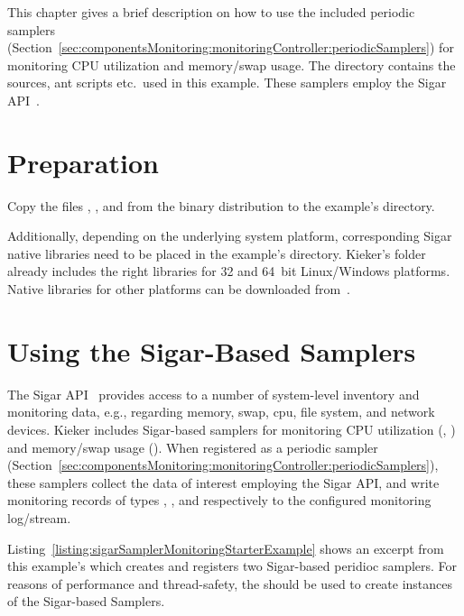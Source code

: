 This chapter gives a brief description on how to use the included %
periodic samplers (Section~\ref{sec:componentsMonitoring:monitoringController:periodicSamplers}) %
for monitoring CPU utilization and memory/swap usage. %
The directory \dir{\SigarExampleDirDistro/} contains the %
sources, ant scripts etc.\ used in this example. %
These samplers employ the Sigar API~\cite{HypericSigarWebsite}. \\%

\section{Preparation}

\begin{compactenum}
\item Copy the files \file{\mainJar}, \file{\commonsLoggingJar}, and \file{\sigarJar} from the %
binary distribution to the example's  directory.
\item Additionally, depending on the underlying system platform, %
corresponding Sigar native libraries need to be placed in the example's  directory. %
Kieker's  folder already includes the right libraries for 32 and 64~bit Linux/Windows platforms. %
Native libraries for other platforms can be downloaded from~\cite{HypericSigarWebsite}. %
\end{compactenum}

\section{Using the Sigar-Based Samplers}

The Sigar API~\cite{HypericSigarWebsite} provides access to a number of system-level inventory and monitoring data, %
e.g., regarding memory, swap, cpu, file system, and network devices. %
Kieker includes Sigar-based samplers %
for monitoring CPU utilization %
(, ) %
and memory/swap usage (). %
When registered as a periodic sampler (Section~\ref{sec:componentsMonitoring:monitoringController:periodicSamplers}), %
these samplers collect the data of interest employing the Sigar API, %
and write monitoring records of types , %
, and  respectively %
to the configured monitoring log/stream. %

Listing~\ref{listing:sigarSamplerMonitoringStarterExample} shows an excerpt from %
this example's  %
which creates and registers two Sigar-based peridioc samplers. %
For reasons of performance and thread-safety, the  %
should be used to create instances of the Sigar-based Samplers. 

